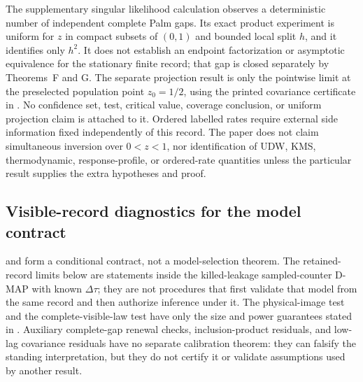The supplementary singular likelihood calculation observes a deterministic
number of independent complete Palm gaps.  Its exact product experiment is
uniform for \(z\) in compact subsets of \((0,1)\) and bounded local split
\(h\), and it identifies only \(h^2\).  It does not establish an endpoint
factorization or asymptotic equivalence for the stationary finite record; that
gap is closed separately by Theorems~F and G.  The
separate projection result is only the pointwise limit at the preselected
population point \(z_0=1/2\), using the printed covariance certificate in
.  No confidence set, test,
critical value, coverage conclusion, or uniform projection claim is attached
to it.
Ordered labelled rates require external side information fixed independently
of this record.  The paper does not claim
simultaneous inversion over \(0<z<1\), nor identification of UDW, KMS,
thermodynamic, response-profile, or ordered-rate quantities unless the
particular result supplies the extra hypotheses and proof.

\subsection{Visible-record diagnostics for the model contract}\label{subsec:visible-record-model-diagnostics-main}

 and
 form a conditional contract, not a
model-selection theorem.  The retained-record limits below are statements
inside the killed-leakage sampled-counter D-MAP with known \(\Delta\tau\);
they are not procedures that first validate that model from the same record and
then authorize inference under it.  The physical-image test and the
complete-visible-law test have only the size and power guarantees stated in
.
Auxiliary complete-gap renewal
checks, inclusion-product residuals, and low-lag covariance residuals have no
separate calibration theorem: they can falsify the standing interpretation,
but they do not certify it or validate assumptions used by another result.


